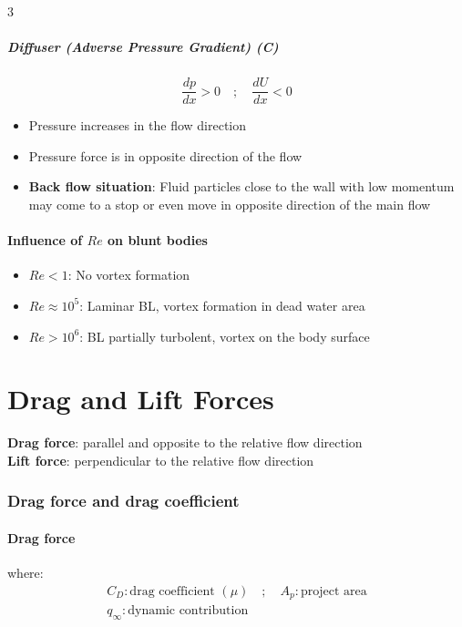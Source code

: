 \documentclass[9pt, landscape, a4paper]{article}
\newcommand{\figbox}[1]{ 
  \begin{center}
    \fbox{\begin{varwidth}{\textwidth} #1 \end{varwidth}} 
  \end{center}       
}
\newcommand{\dm}{\displaystyle}
\begin{document}
\begin{multicols*}{3}
\subsubsection{Diffuser (Adverse Pressure Gradient) {\color{red} (C)}}
\[\frac{dp}{dx} > 0 \quad ; \quad \frac{dU}{dx} < 0\]
\begin{itemize}
  \item Pressure increases in the flow direction
  \item Pressure force is in opposite direction of the flow
  \item \textbf{Back flow situation}: Fluid particles close to the wall with low momentum may come to a stop or even move in opposite direction of the main flow
\end{itemize}

\subsection{Influence of $Re$ on blunt bodies}
\begin{itemize}
  \item $Re < 1$: No vortex formation
  \item $Re \approx 10^5$: Laminar BL, vortex formation in dead water area 
  \item $Re > 10^6$: BL partially turbolent, vortex on the body surface
\end{itemize}

\part{Drag and Lift Forces}
\textbf{Drag force}: parallel and opposite to the relative flow direction\\
\textbf{Lift force}: perpendicular to the relative flow direction

\section{Drag force and drag coefficient}
\subsection{Drag force}
\figbox{$\dm F_D = C_D q_\infty A_P = C_D\frac{1}{2}\rho v_\infty^2 A_p$}

where:
\begin{gather*}
  C_D: \text{drag coefficient } (\mu)\quad ; \quad A_p: \text{project area}\\
  q_\infty: \text{dynamic contribution}
\end{gather*}


\end{multicols*}
\end{document}
